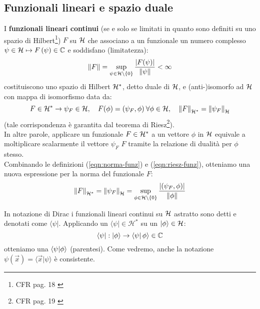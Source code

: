 \documentclass[FisicaTeorica.tex]{subfiles}
\begin{document}
\subsection{Funzionali lineari e spazio duale}
I \textbf{funzionali lineari continui} (se e solo se limitati in quanto sono definiti su uno spazio di Hilbert\footnote{CFR pag. 18 \cite{spazi_hilbert}}) $F$ su $\mathcal{H}$ che associano a un funzionale un numero complesso $\psi\in\mathcal{H}\mapsto F\left(\psi\right)\in \mathbb{C}$ e soddisfano (limitatezza):
\begin{equation}
    \left\lVert F\right\rVert = \sup_{\psi \in \mathcal{H}\setminus \{0\}} \frac{|F(\psi)|}{\left\lVert\psi\right\rVert} < \infty
    \label{eqn:norma-funz}
\end{equation}
costituiscono uno spazio di Hilbert $\mathcal{H}^*$, detto duale di $\mathcal{H}$, e (anti-)isomorfo ad $\mathcal{H}$ con mappa di isomorfismo data da:
\begin{equation}
F\in \mathcal{H}^*\rightarrow \psi_F\in \mathcal{H}, \quad F(\phi) = (\psi_F, \phi)\> \forall \phi \in \mathcal{H}, \quad \left\lVert F\right\rVert_{\mathcal{H}^*}=\left\lVert\psi_F\right\rVert_{\mathcal{H}}
\label{eqn:riesz-funz}
\end{equation}
(tale corrispondenza è garantita dal teorema di Riesz\footnote{CFR pag. 19 \cite{spazi_hilbert}}).\\
In altre parole, applicare un funzionale $F \in \mathcal{H}^*$ a un vettore $\phi$ in $\mathcal{H}$ equivale a moltiplicare scalarmente il vettore $\psi_F$  $F$ tramite la relazione di dualità per $\phi$ stesso.\\
Combinando le definizioni (\ref{eqn:norma-funz}) e (\ref{eqn:riesz-funz}), otteniamo una nuova espressione per la norma del funzionale $F$: 
\begin{equation}
\left\lVert F\right\rVert_{\mathcal{H}^*} = \left\lVert\psi_F\right\rVert_{\mathcal{H}} = \sup_{\phi\in\mathcal{H} \setminus \{0\}} \frac{|(\psi_F,\phi)|}{\left\lVert\phi\right\rVert}
\label{eqn:normafunz}
\end{equation}

In notazione di Dirac i funzionali lineari continui su $\mathcal{H}$ astratto sono detti  e denotati come $\langle\psi|$.
Applicando un  $\langle \psi |\in \mathcal{H}^*$ su un  $\left|\phi\right\rangle\in \mathcal{H}$:
\[
\left\langle\psi\right|:\left|\phi\right\rangle\rightarrow \left\langle\psi\right|\phi \rangle \in \mathbb{C}
\]
otteniamo una  $\braket{\psi|\phi}$ (parentesi).
Come vedremo, anche la notazione $\psi \left(\vec{x}\right)=\langle \vec{x}|\psi \rangle$  è  consistente.\\
\end{document}
